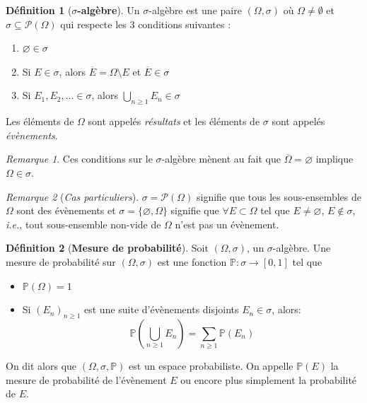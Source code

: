 \documentclass[12pt,a4paper]{report}
\theoremstyle{definition}%
\newtheorem{definition}{Définition}[chapter]
\theoremstyle{remark}
\newtheorem{remark}{Remarque}[chapter]
\newcommand{\ie}{\textit{i.e.}, }
\let\labelitemi\labelitemii
\begin{document}
\begin{definition}[\textbf{$\sigma$-algèbre}]
	Un $\sigma$-algèbre est une paire $(\Omega, \sigma)$ où $\Omega \neq \emptyset $ et $\sigma \subseteq \mathcal{P}(\Omega)$ qui respecte les $3$ conditions suivantes :
	\begin{enumerate}
		\item $\varnothing \in \sigma$
		\item Si $E \in \sigma$, alors $\overline{E} = \Omega \setminus E$ et $\overline{E} \in \sigma$
		\item Si $E_1, E_2, \dots \in \sigma$, alors $\bigcup_{n \geq 1} E_n \in \sigma$
	\end{enumerate}
	Les éléments de $\Omega$ sont appelés \textit{résultats} et les éléments de $\sigma$ sont appelés \textit{évènements}.
\end{definition}

\begin{remark}
	Ces conditions sur le $\sigma$-algèbre mènent au fait que $\overline{\Omega} = \varnothing$ implique $\Omega \in \sigma$.
\end{remark}
\begin{remark}[\textit{Cas particuliers}]
		$\sigma = \mathcal{P}(\Omega)$ signifie que tous les sous-ensembles de $\Omega$ sont des évènements et 
		$\sigma = \{\varnothing, \Omega\}$ signifie que $\forall E \subset \Omega$ tel que $E \neq \varnothing$, $E \notin \sigma$, \ie tout sous-ensemble non-vide de $\Omega$ n'est pas un évènement.
\end{remark}

\begin{definition}[\textbf{Mesure de probabilité}]\label{proba_measure} Soit $(\Omega, \sigma)$, un $\sigma$-algèbre.
	Une mesure de probabilité sur $(\Omega, \sigma)$ est une fonction $\mathbb{P} : \sigma \rightarrow [0, 1]$ tel que
	\begin{itemize}
		\renewcommand{\labelitemi}{\tiny$\bullet$}
		\item $\mathbb{P}(\Omega) = 1$
		\item Si $(E_n)_{n \geq 1}$ est une suite d'évènements disjoints $E_n \in \sigma$, alors:
		\[\mathbb{P}(\bigcup_{n \geq 1} E_n) = \sum_{n \geq 1} \mathbb{P}(E_n)\]
	\end{itemize}
	On dit alors que $(\Omega, \sigma, \mathbb{P})$ est un espace probabiliste.
	On appelle $\mathbb{P}(E)$ la mesure de probabilité de l'évènement $E$ ou encore plus simplement la probabilité de $E$.
\end{definition}
\end{document}
